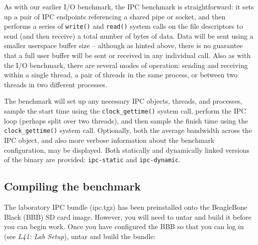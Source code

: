 \documentclass[a4paper,10pt]{article}
\begin{document}
As with our earlier I/O benchmark, the IPC benchmark is straightforward: it
sets up a pair of IPC endpoints referencing a shared pipe or socket, and then
performs a series of \texttt{write()} and \texttt{read()} system calls on the
file descriptors to send (and then receive) a total number of bytes of data.
Data will be sent using a smaller userspace buffer size -- although as hinted
above, there is no guarantee that a full user buffer will be sent or received
in any individual call.
Also as with the I/O benchmark, there are several modes of operation:
sending and receiving within a single thread, a pair of threads in the same
process, or between two threads in two different processes.

The benchmark will set up any necessary IPC objects, threads, and processes,
sample the start time using the \texttt{clock\_gettime()} system call, perform
the IPC loop (perhaps split over two threads), and then sample the finish time
using the \texttt{clock\_gettime()} system call.
Optionally, both the average bandwidth across the IPC object, and also more
verbose information about the benchmark configuration, may be displayed.
Both statically and dynamically linked versions of the binary are provided:
\texttt{ipc-static} and \texttt{ipc-dynamic}.

\subsection*{Compiling the benchmark}





The laboratory IPC bundle (ipc.tgz) has been preinstalled onto the BeagleBone
Black (BBB) SD card image.
However, you will need to untar and build it before you can begin work.
Once you have configured the BBB so that you can log in (see \textit{L41: Lab
Setup}), untar and build the bundle:
\end{document}
